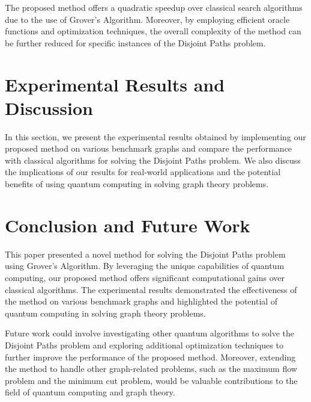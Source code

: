 The proposed method offers a quadratic speedup over classical search algorithms due to the use of Grover's Algorithm. Moreover, by employing efficient oracle functions and optimization techniques, the overall complexity of the method can be further reduced for specific instances of the Disjoint Paths problem.

\section{Experimental Results and Discussion}
\label{sec:results}

In this section, we present the experimental results obtained by implementing our proposed method on various benchmark graphs and compare the performance with classical algorithms for solving the Disjoint Paths problem. We also discuss the implications of our results for real-world applications and the potential benefits of using quantum computing in solving graph theory problems.

\section{Conclusion and Future Work}
\label{sec:conclusion}

This paper presented a novel method for solving the Disjoint Paths problem using Grover's Algorithm. By leveraging the unique capabilities of quantum computing, our proposed method offers significant computational gains over classical algorithms. The experimental results demonstrated the effectiveness of the method on various benchmark graphs and highlighted the potential of quantum computing in solving graph theory problems.

Future work could involve investigating other quantum algorithms to solve the Disjoint Paths problem and exploring additional optimization techniques to further improve the performance of the proposed method. Moreover, extending the method to handle other graph-related problems, such as the maximum flow problem and the minimum cut problem, would be valuable contributions to the field of quantum computing and graph theory.

